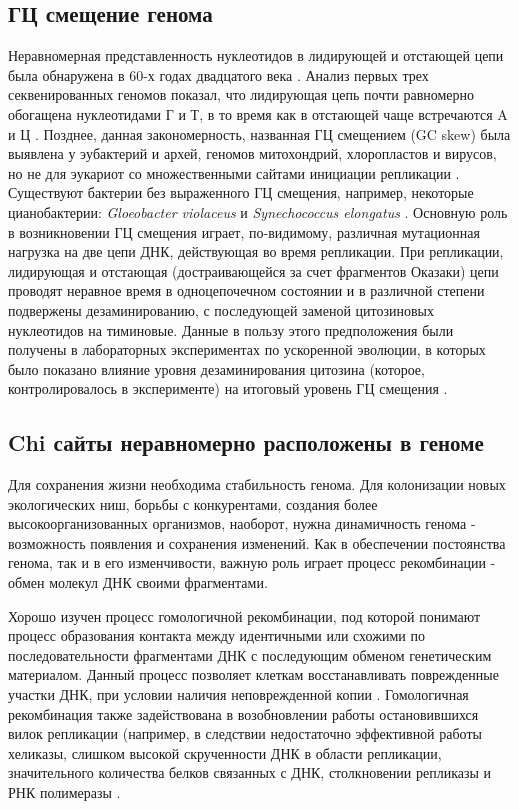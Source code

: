 \subsection{ГЦ смещение генома}
Неравномерная представленность нуклеотидов в лидирующей и отстающей цепи была обнаружена в 60-х годах двадцатого века \cite{szybalski1966pyrimidine}. Анализ первых трех секвенированных геномов показал, что лидирующая цепь почти равномерно обогащена нуклеотидами Г и Т, в то время как в отстающей чаще встречаются A и Ц \cite{lobry1996asymmetric}. Позднее, данная закономерность, названная ГЦ смещением (GC skew) была выявлена у эубактерий и архей, геномов митохондрий, хлоропластов и вирусов, но не для эукариот со множественными сайтами инициации репликации \cite{lobry1999genomic}. Существуют бактерии без выраженного ГЦ смещения, например, некоторые цианобактерии: \textit{Gloeobacter violaceus} и \textit{Synechococcus elongatus} \cite{arakawa2007gc}. Основную роль в возникновении ГЦ смещения играет, по-видимому, различная мутационная нагрузка на две цепи ДНК, действующая во время репликации. При репликации, лидирующая и отстающая (достраивающейся за счет фрагментов Оказаки) цепи проводят неравное время в одноцепочечном состоянии и в различной степени подвержены дезаминированию, с последующей заменой цитозиновых нуклеотидов на тиминовые. Данные в пользу этого предположения были получены в лабораторных экспериментах по ускоренной эволюции, в которых было показано влияние уровня дезаминирования цитозина (которое, контролировалось в эксперименте) на итоговый уровень ГЦ смещения \cite{kono2018accelerated}. 

\subsection{Chi сайты неравномерно расположены в геноме}
Для сохранения жизни необходима стабильность генома. Для колонизации новых экологических ниш, борьбы с конкурентами, создания более высокоорганизованных организмов, наоборот, нужна динамичность генома - возможность появления и сохранения изменений. Как в обеспечении постоянства генома, так и в его изменчивости, важную роль играет процесс рекомбинации - обмен молекул ДНК своими фрагментами.

Хорошо изучен процесс гомологичной рекомбинации, под которой понимают процесс образования контакта между идентичными или схожими по последовательности фрагментами ДНК с последующим обменом генетическим материалом. Данный процесс позволяет клеткам восстанавливать поврежденные участки ДНК, при условии наличия неповрежденной копии \cite{kuzminov1999recombinational}. Гомологичная рекомбинация также задействована в возобновлении работы остановившихся вилок репликации (например, в следствии недостаточно эффективной работы хеликазы, слишком высокой скрученности ДНК в области репликации, значительного количества белков связанных с ДНК, столкновении репликазы и РНК полимеразы \cite{michel2000resolution, sankar2016nature}.

